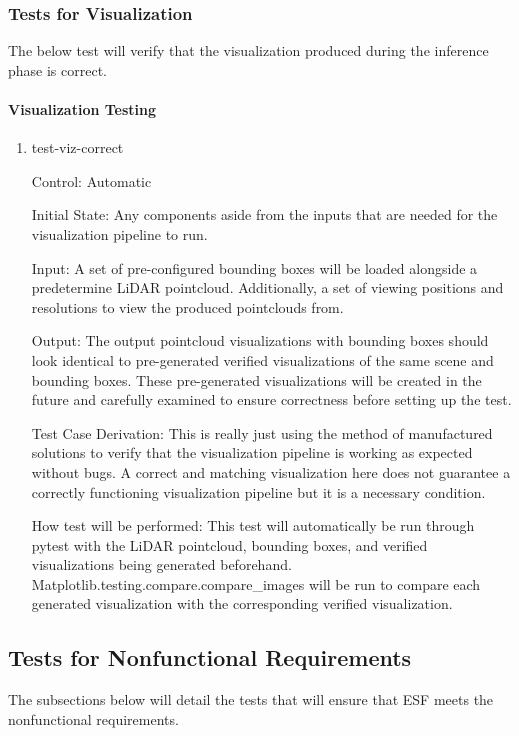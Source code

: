\documentclass[12pt, titlepage]{article}
\newcommand{\ProjectName}{ESF }
\begin{document}
\subsubsection{Tests for Visualization}

The below test will verify that the visualization produced during the inference phase is correct.

\paragraph{Visualization Testing}
\begin{enumerate}

  \item{test-viz-correct\\}
  
  Control: Automatic
            
  Initial State: Any components aside from the inputs that are needed for the visualization pipeline to run.
            
  Input: A set of pre-configured bounding boxes will be loaded alongside a predetermine LiDAR pointcloud. Additionally, a set of viewing positions and resolutions
  to view the produced pointclouds from.

  Output: The output pointcloud visualizations with bounding boxes should look identical to pre-generated verified visualizations of the same scene and bounding boxes. These
  pre-generated visualizations will be created in the future and carefully examined to ensure correctness before setting up the test.
  
  Test Case Derivation: This is really just using the method of manufactured solutions to verify that the visualization pipeline is working as expected without bugs. A correct
  and matching visualization here does not guarantee a correctly functioning visualization pipeline but it is a necessary condition.
            
  How test will be performed: This test will automatically be run through pytest with the LiDAR pointcloud, bounding boxes, and verified visualizations being generated beforehand.
  Matplotlib.testing.compare.compare\_images will be run to compare each generated visualization with the corresponding verified visualization.
\end{enumerate}

\subsection{Tests for Nonfunctional Requirements}
The subsections below will detail the tests that will ensure that \ProjectName{}meets the nonfunctional requirements.
\end{document}
